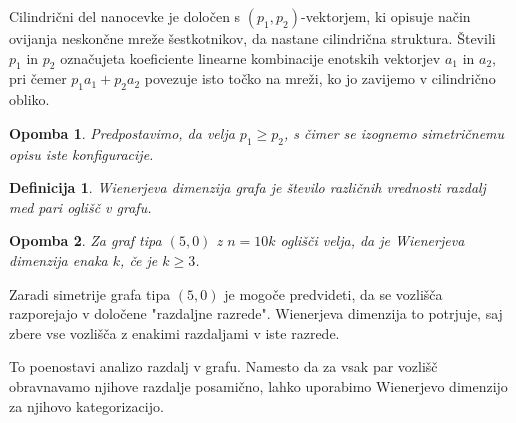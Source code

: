 \documentclass[a4paper, 12pt]{article}
\newtheorem{definicija}{Definicija}[section]
\newtheorem{opomba}{Opomba}[section]
\begin{document}
Cilindrični del nanocevke je določen s $(p_1, p_2)$-vektorjem, ki opisuje način ovijanja neskončne mreže šestkotnikov, da nastane cilindrična struktura.  
Števili $p_1$ in $p_2$ označujeta koeficiente linearne kombinacije enotskih vektorjev $a_1$ in $a_2$, pri čemer $p_1a_1 + p_2a_2$ povezuje isto točko na mreži, ko jo zavijemo v cilindrično obliko.

\begin{opomba}
    Predpostavimo, da velja $p_1 \geq p_2$, s čimer se izognemo simetričnemu opisu iste konfiguracije.
\end{opomba}


\begin{definicija} 
    Wienerjeva dimenzija grafa je število različnih vrednosti razdalj med pari oglišč v grafu. 
\end{definicija} 

\begin{opomba} 
    Za graf tipa $(5,0)$ z $n = 10k$ oglišči velja, da je Wienerjeva dimenzija enaka $k$, če je $k \geq 3$. 
\end{opomba} 


Zaradi simetrije grafa tipa $(5,0)$ je mogoče predvideti, da se vozlišča razporejajo v določene "razdaljne razrede". 
Wienerjeva dimenzija to potrjuje, saj zbere vse vozlišča z enakimi razdaljami v iste razrede. 

To poenostavi analizo razdalj v grafu. 
Namesto da za vsak par vozlišč obravnavamo njihove razdalje posamično, lahko uporabimo Wienerjevo dimenzijo za njihovo kategorizacijo.
\end{document}
